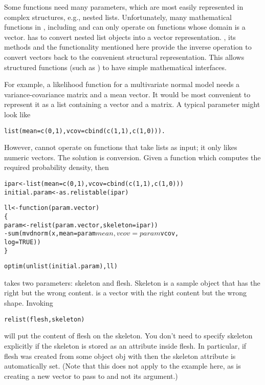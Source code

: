 \begin{Details}\relax
Some functions need many parameters, which are most easily represented in
complex structures, e.g., nested lists.  Unfortunately, many
mathematical functions in \R{}, including  and
 can only operate on functions whose domain is
a vector.  \R{} has  to convert nested list
objects into a vector representation.  , its methods and
the functionality mentioned here provide the inverse operation to convert
vectors back to the convenient structural representation.
This allows structured functions (such as ) to have simple
mathematical interfaces.

For example, a likelihood function for a multivariate normal model needs a
variance-covariance matrix and a mean vector.  It would be most convenient to
represent it as a list containing a vector and a matrix.  A typical parameter
might look like
\begin{alltt}      list(mean=c(0, 1), vcov=cbind(c(1, 1), c(1, 0))).\end{alltt}

However,  cannot operate on functions that take
lists as input; it only likes numeric vectors.  The solution is
conversion. Given a function 
which computes the required probability density, then
\begin{alltt}        ipar <- list(mean=c(0, 1), vcov=cbind(c(1, 1), c(1, 0)))
        initial.param <- as.relistable(ipar)

        ll <- function(param.vector)
        \{
           param <- relist(param.vector, skeleton=ipar))
           -sum(mvdnorm(x, mean = param$mean, vcov = param$vcov,
                        log = TRUE))
        \}

        optim(unlist(initial.param), ll)
\end{alltt}

 takes two parameters: skeleton and flesh.  Skeleton is a sample
object that has the right  but the wrong content.  
is a vector with the right content but the wrong shape.  Invoking
\begin{alltt}    relist(flesh, skeleton)\end{alltt}

will put the content of flesh on the skeleton.  You don't need to specify
skeleton explicitly if the skeleton is stored as an attribute inside flesh.
In particular, if flesh was created from some object obj with
then the skeleton attribute is automatically set.  (Note that this
does not apply to the example here, as  is creating
a new vector to pass to  and not its  argument.)


\end{Details}
